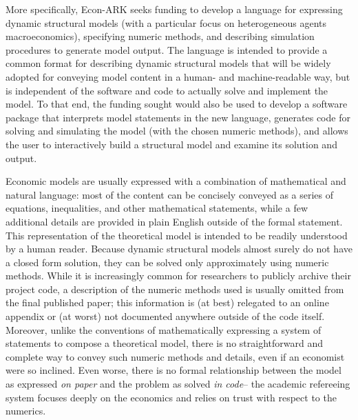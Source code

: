 \documentclass[11pt,pdftex,letterpaper]{article}
\begin{document}
More specifically, Econ-ARK seeks funding to develop a language for expressing dynamic structural models (with a particular focus on heterogeneous agents macroeconomics), specifying numeric methods, and describing simulation procedures to generate model output. The language is intended to provide a common format for describing dynamic structural models that will be widely adopted for conveying model content in a human- and machine-readable way, but is independent of the software and code to actually solve and implement the model. To that end, the funding sought would also be used to develop a software package that interprets model statements in the new language, generates code for solving and simulating the model (with the chosen numeric methods), and allows the user to interactively build a structural model and examine its solution and output.

Economic models are usually expressed with a combination of mathematical and natural language: most of the content can be concisely conveyed as a series of equations, inequalities, and other mathematical statements, while a few additional details are provided in plain English outside of the formal statement. This representation of the theoretical model is intended to be readily understood by a human reader. Because dynamic structural models almost surely do not have a closed form solution, they can be solved only approximately using numeric methods. While it is increasingly common for researchers to publicly archive their project code, a description of the numeric methods used is usually omitted from the final published paper; this information is (at best) relegated to an online appendix or (at worst) not documented anywhere outside of the code itself. Moreover, unlike the conventions of mathematically expressing a system of statements to compose a theoretical model, there is no straightforward and complete way to convey such numeric methods and details, even if an economist were so inclined. Even worse, there is no formal relationship between the model as expressed \textit{on paper} and the problem as solved \textit{in code}-- the academic refereeing system focuses deeply on the economics and relies on trust with respect to the numerics.
\end{document}
